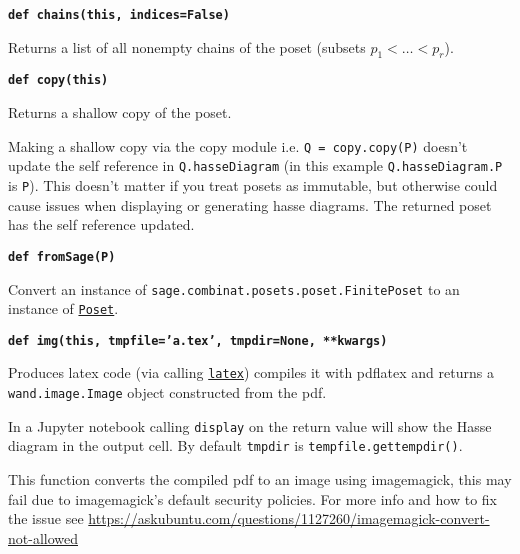 \documentclass[12pt]{article}
\begin{document}
\begin{child}
{{}\endlist}

\textbf{\hypertarget{Poset.chains}{\texttt{def chains(this, indices=False)}}}
{\list{}{\leftmargin 0.5cm}\item{
Returns a list of all nonempty chains of the poset (subsets $p_1<\dots<p_r$).


}\endlist}

\textbf{\hypertarget{Poset.copy}{\texttt{def copy(this)}}}
{\list{}{\leftmargin 0.5cm}\item{
Returns a shallow copy of the poset.

Making a shallow copy via the copy module i.e. \verb|Q = copy.copy(P)|
doesn't update the self reference in \verb|Q.hasseDiagram| (in this example
\verb|Q.hasseDiagram.P| is \verb|P|). This doesn't matter if you treat posets as immutable,
but otherwise could cause issues when displaying or generating hasse diagrams.
The returned poset has the self reference updated.


}\endlist}

\textbf{\hypertarget{Poset.fromSage}{\texttt{def fromSage(P)}}}
{\list{}{\leftmargin 0.5cm}\item{
Convert an instance of \verb|sage.combinat.posets.poset.FinitePoset| to an instance of \hyperlink{Poset}{\texttt{Poset}}.


}\endlist}

\textbf{\hypertarget{Poset.img}{\texttt{def img(this, tmpfile='a.tex', tmpdir=None, **kwargs)}}}
{\list{}{\leftmargin 0.5cm}\item{
Produces latex code (via calling \hyperlink{Poset.latex}{\texttt{latex}}) compiles it with pdflatex and returns a \verb|wand.image.Image| object constructed from the pdf.

In a Jupyter notebook calling \verb|display| on the return value will show the Hasse diagram in the output cell.
By default \verb|tmpdir| is \verb|tempfile.gettempdir()|.

This function converts the compiled pdf to an image using imagemagick, this may fail due to imagemagick's default security policies.
For more info and how to fix the issue see \url{https://askubuntu.com/questions/1127260/imagemagick-convert-not-allowed}

}}
\end{child}
\end{document}
